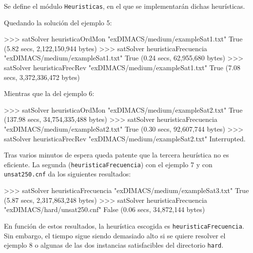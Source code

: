 Se define el módulo \texttt{Heuristicas}, en el que se implementarán dichas heurísticas.


Quedando la solución del ejemplo 5:

\begin{code}
>>> satSolver heuristicaOrdMon "exDIMACS/medium/exampleSat1.txt"
True
(5.82 secs, 2,122,150,944 bytes)
>>> satSolver heuristicaFrecuencia "exDIMACS/medium/exampleSat1.txt"
True
(0.24 secs, 62,955,680 bytes)
>>> satSolver heuristicaFrecRev "exDIMACS/medium/exampleSat1.txt"
True
(7.08 secs, 3,372,336,472 bytes)
\end{code}

Mientras que la del ejemplo 6:

\begin{code}
>>> satSolver heuristicaOrdMon "exDIMACS/medium/exampleSat2.txt"
True
(137.98 secs, 34,754,335,488 bytes)
>>> satSolver heuristicaFrecuencia "exDIMACS/medium/exampleSat2.txt"
True
(0.30 secs, 92,607,744 bytes)
>>> satSolver heuristicaFrecRev "exDIMACS/medium/exampleSat2.txt"
Interrupted.
\end{code}

Tras varios minutos de espera queda patente que la tercera heurística no es eficiente.  La segunda (\texttt{heuristicaFrecuencia}) con el ejemplo 7 y con \texttt{unsat250.cnf} da los siguientes resultados:

\begin{code}
>>> satSolver heuristicaFrecuencia "exDIMACS/medium/exampleSat3.txt"
True
(5.87 secs, 2,317,863,248 bytes)
>>> satSolver heuristicaFrecuencia "exDIMACS/hard/unsat250.cnf"
False
(0.06 secs, 34,872,144 bytes)
\end{code}

En función de estos resultados, la heurística escogida es \texttt{heuristicaFrecuencia}. Sin embargo, el tiempo sigue siendo demasiado alto si se quiere resolver el ejemplo 8 o algunas de las dos instancias satisfacibles del directorio \texttt{hard}.